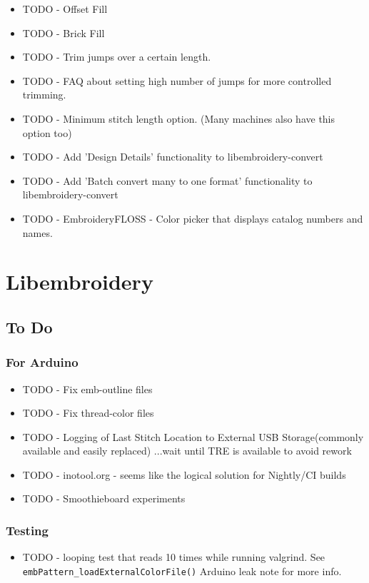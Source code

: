 \documentclass{report}
\begin{document}
\begin{itemize}
\item TODO - Offset Fill
\item TODO - Brick Fill
\item TODO - Trim jumps over a certain length.
\item TODO - FAQ about setting high number of jumps for more controlled trimming.
\item TODO - Minimum stitch length option. (Many machines also have this option too)
\item TODO - Add 'Design Details' functionality to libembroidery-convert
\item TODO - Add 'Batch convert many to one format' functionality to libembroidery-convert
\item TODO - EmbroideryFLOSS - Color picker that displays catalog numbers and names.
\end{itemize}

\chapter{Libembroidery}

\section{To Do}

\subsection{For Arduino}

\begin{itemize}
\item TODO - Fix emb-outline files
\item TODO - Fix thread-color files
\item TODO - Logging of Last Stitch Location to External USB Storage(commonly available and easily replaced) ...wait until TRE is available to avoid rework
\item TODO - inotool.org - seems like the logical solution for Nightly/CI builds
\item TODO - Smoothieboard experiments
\end{itemize}

\subsection{Testing}

\begin{itemize}
\item TODO - looping test that reads 10 times while running valgrind. See \texttt{embPattern\_loadExternalColorFile()} Arduino leak note for more info.
\end{itemize}
\end{document}
